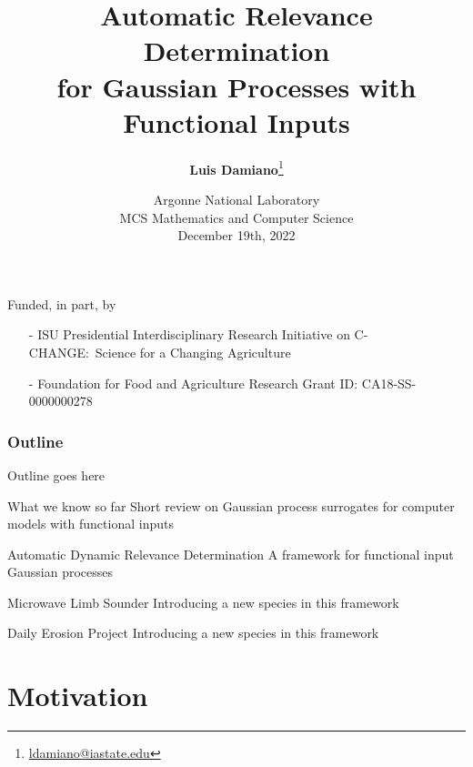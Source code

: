 \documentclass{snedecorbeamer}
\title{\textbf{Automatic Relevance Determination} \\
  for Gaussian Processes with Functional Inputs}
\author[Damiano et al]{
  \textbf{Luis Damiano}\footnote[2]{
    \tiny{\href{mailto:ldamiano@iastate.edu}{ldamiano@iastate.edu}}
  }}
\institute{
  Department of Statistics, Iowa State University
}
\date[December 19th, 2022]{
  \tiny{Argonne National Laboratory \\
    MCS Mathematics and Computer Science} \\
  December 19th, 2022}
\begin{document}
\begin{frame}
  \titlepage{}
  {
    \tiny{
      Funded, in part, by
      \begin{itemize}
      \item[-] ISU Presidential Interdisciplinary
	Research Initiative on C-CHANGE:~Science for a Changing
	Agriculture
      \item[-] Foundation for Food and Agriculture Research
	Grant ID: CA18-SS-0000000278
      \end{itemize}
    }
  }
\end{frame}

\begin{frame}
  \frametitle{Outline}

  Outline goes here

  What we know so far
  Short review on Gaussian process surrogates for computer models with
  functional inputs

  Automatic Dynamic Relevance Determination
  A framework for functional input Gaussian processes

  Microwave Limb Sounder
  Introducing a new species in this framework

  Daily Erosion Project
  Introducing a new species in this framework
\end{frame}

\section{Motivation}
\end{document}
